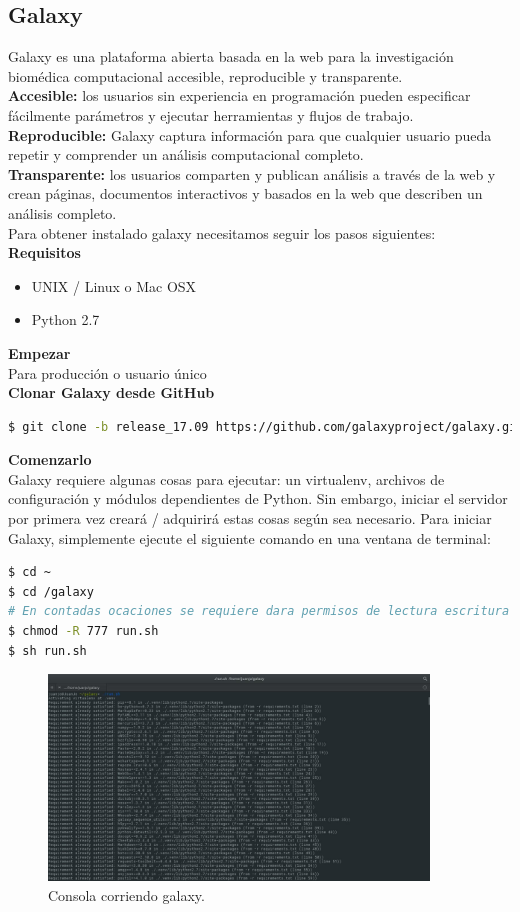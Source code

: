 \documentclass[12pt,letterpaper]{article}
\begin{document}
\subsection{Galaxy}
Galaxy es una plataforma abierta basada en la web para la investigación biomédica computacional accesible, reproducible y transparente.\\
\textbf{Accesible:} los usuarios sin experiencia en programación pueden especificar fácilmente parámetros y ejecutar herramientas y flujos de trabajo.\\
\textbf{Reproducible:} Galaxy captura información para que cualquier usuario pueda repetir y comprender un análisis computacional completo.\\
\textbf{Transparente:} los usuarios comparten y publican análisis a través de la web y crean páginas, documentos interactivos y basados ​​en la web que describen un análisis completo.\\
Para obtener instalado galaxy necesitamos seguir los pasos siguientes:\\
\textbf{Requisitos}
\begin{itemize}
\item UNIX / Linux o Mac OSX
\item Python 2.7
\end{itemize}
\textbf{Empezar}\\
Para producción o usuario único\\
\textbf{Clonar Galaxy desde GitHub}\\
\begin{lstlisting}[language=bash, style=consola]
$ git clone -b release_17.09 https://github.com/galaxyproject/galaxy.git
\end{lstlisting}
\textbf{Comenzarlo}
\\
Galaxy requiere algunas cosas para ejecutar: un virtualenv, archivos de configuración y módulos dependientes de Python. Sin embargo, iniciar el servidor por primera vez creará / adquirirá estas cosas según sea necesario. Para iniciar Galaxy, simplemente ejecute el siguiente comando en una ventana de terminal:
\begin{lstlisting}[language=bash, style=consola]
$ cd ~
$ cd /galaxy
# En contadas ocaciones se requiere dara permisos de lectura escritura y ejecución para ello ponmos en terminal:
$ chmod -R 777 run.sh
$ sh run.sh
\end{lstlisting}
\begin{figure}[h]
\begin{center}
\includegraphics[width=0.9\textwidth]{run.png}
\end{center}
\caption{Consola corriendo galaxy.}
\end{figure}
\end{document}
